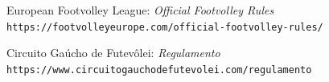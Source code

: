 \documentclass[a4paper,11pt]{article}
\begin{document}
\renewcommand{\refname}{}

\begin{thebibliography}{1}

  European Footvolley League:
  \textit{Official Footvolley Rules}
  \\\texttt{https://footvolleyeurope.com/official-footvolley-rules/}

  Circuito Gaúcho de Futevôlei:
  \textit{Regulamento}
  \\\texttt{https://www.circuitogauchodefutevolei.com/regulamento}
\end{thebibliography}
\end{document}
